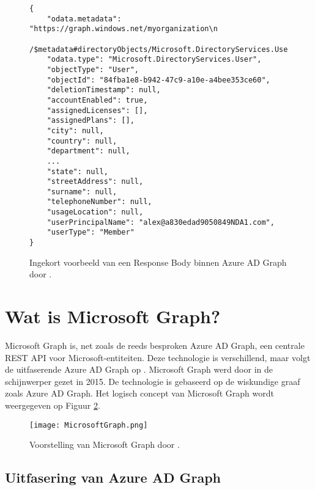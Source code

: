 \begin{figure}[h!]
    \scriptsize
    \begin{verbatim}
{
    "odata.metadata": "https://graph.windows.net/myorganization\n
    /$metadata#directoryObjects/Microsoft.DirectoryServices.User/@Element",
    "odata.type": "Microsoft.DirectoryServices.User",
    "objectType": "User",
    "objectId": "84fba1e8-b942-47c9-a10e-a4bee353ce60",
    "deletionTimestamp": null,
    "accountEnabled": true,
    "assignedLicenses": [],
    "assignedPlans": [],
    "city": null,
    "country": null,
    "department": null,
    ...
    "state": null,
    "streetAddress": null,
    "surname": null,
    "telephoneNumber": null,
    "usageLocation": null,
    "userPrincipalName": "alex@a830edad9050849NDA1.com",
    "userType": "Member"
}
    \end{verbatim}
    \caption[Voorbeeld Response Body Azure AD Graph]{Ingekort voorbeeld van een Response Body binnen Azure \ac{AD} Graph door \textcite{Microsoft2015}.}
    \label{hresb}
\end{figure}


\section{Wat is Microsoft Graph?}


Microsoft Graph is, net zoals de reeds besproken Azure \Ac{AD} Graph, een centrale \ac{REST} \ac{API} voor Microsoft-entiteiten. Deze technologie is verschillend, maar volgt de uitfaserende Azure \ac{AD} Graph op \autocite{Microsoft2023n}. Microsoft Graph werd door \textcite{Microsoft2015a} in de schijnwerper gezet in 2015. De technologie is gebaseerd op de wiskundige graaf zoals Azure \Ac{AD} Graph. Het logisch concept van Microsoft Graph wordt weergegeven op Figuur \ref{msg}. \\

\begin{figure}[h]
    \texttt{[image: MicrosoftGraph.png]}
    \caption[Voorbeeld Microsoft Graph]{Voorstelling van Microsoft Graph door \textcite{Microsoft2023d}.}
    \label{msg}
\end{figure}

\subsection{Uitfasering van Azure AD Graph}

